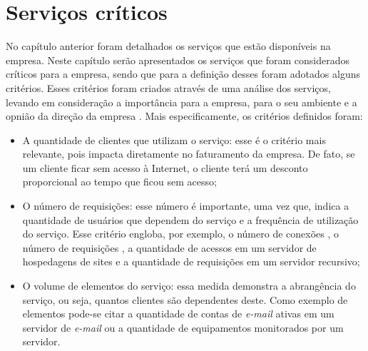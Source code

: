 \chapter{Serviços críticos}
\label{cap:servicoscriticos}

No capítulo anterior foram detalhados os serviços que estão disponíveis na empresa. Neste capítulo serão apresentados os serviços 
que foram considerados críticos para a empresa, sendo que para a definição desses foram adotados alguns critérios. Esses critérios foram criados
através de uma análise dos serviços, levando em consideração a importância para a empresa, para o seu ambiente e a opnião da direção da empresa
\cite{geordano2014}. Mais especificamente, os critérios definidos foram:


\begin{itemize}
 \item A quantidade de clientes que utilizam o serviço: esse é o critério mais relevante, pois impacta diretamente no faturamento
 da empresa. De fato, se um cliente ficar sem acesso à Internet, o cliente terá um desconto proporcional ao tempo que ficou sem 
 acesso; 
 \item O número de requisições: esse número é importante, uma vez que, indica a quantidade de usuários que dependem do serviço e a frequência
 de utilização do serviço. Esse critério engloba, por exemplo, o número de conexões , o número de requisições 
 , a quantidade de acessos em um servidor de hospedagens de sites e a quantidade de requisições  
 em um servidor recursivo;
 \item O volume de elementos do serviço: essa medida demonstra a abrangência do serviço, ou seja, quantos clientes são dependentes deste. 
 Como exemplo de elementos pode-se citar a quantidade de contas de \textit{e-mail} ativas em um servidor de \textit{e-mail} ou a quantidade de 
 equipamentos monitorados por um servidor.
\end{itemize}

